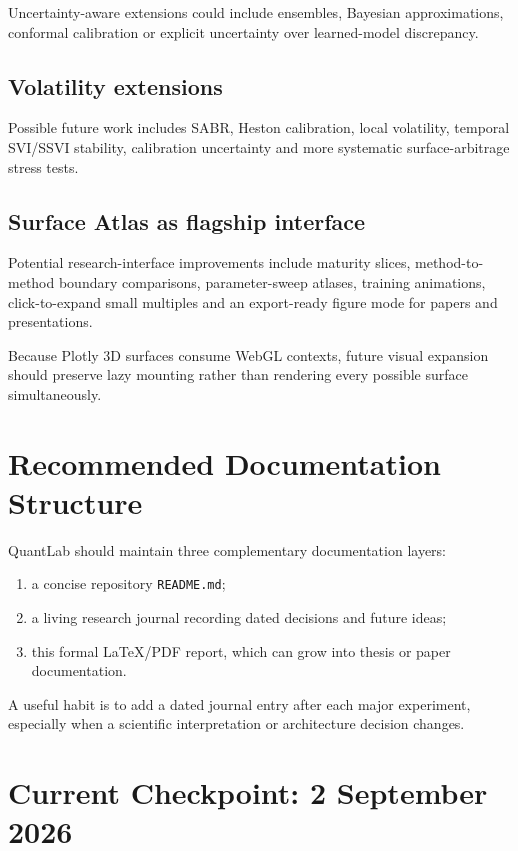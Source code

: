 \documentclass[11pt,a4paper]{article}
\begin{document}
Uncertainty-aware extensions could include ensembles, Bayesian approximations, conformal calibration or explicit uncertainty over learned-model discrepancy.

\subsection{Volatility extensions}

Possible future work includes SABR, Heston calibration, local volatility, temporal SVI/SSVI stability, calibration uncertainty and more systematic surface-arbitrage stress tests.

\subsection{Surface Atlas as flagship interface}

Potential research-interface improvements include maturity slices, method-to-method boundary comparisons, parameter-sweep atlases, training animations, click-to-expand small multiples and an export-ready figure mode for papers and presentations.

Because Plotly 3D surfaces consume WebGL contexts, future visual expansion should preserve lazy mounting rather than rendering every possible surface simultaneously.

\section{Recommended Documentation Structure}

QuantLab should maintain three complementary documentation layers:

\begin{enumerate}[leftmargin=2em]
\item a concise repository \texttt{README.md};
\item a living research journal recording dated decisions and future ideas;
\item this formal LaTeX/PDF report, which can grow into thesis or paper documentation.
\end{enumerate}

A useful habit is to add a dated journal entry after each major experiment, especially when a scientific interpretation or architecture decision changes.

\section{Current Checkpoint: 2 September 2026}
\end{document}
